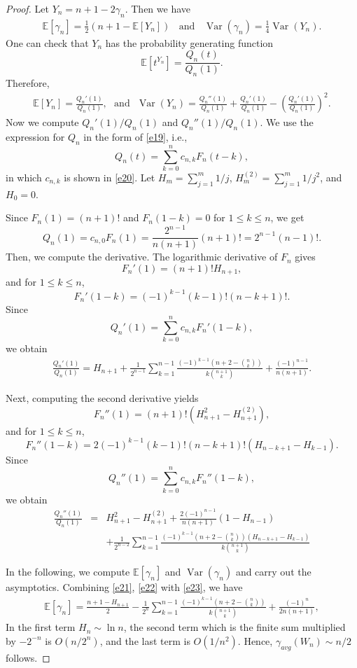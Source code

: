 \documentclass[10pt,a4paper]{amsart}
\newcommand{\E}{\mathbb{E}}
\newcommand{\Var}{\operatorname{Var}}
\begin{document}
\begin{proof} Let \(Y_n=n+1-2\gamma_n\). Then we have
\begin{eqnarray}\label{e21}
\E[\gamma_n]=\frac12\left(n+1-\E[Y_n]\right) ~~~~\mbox{and}~~~~\Var(\gamma_n)=\frac14\Var(Y_n).\end{eqnarray}
One can check that $Y_n$ has the probability generating function
\[
\E[t^{Y_n}]=\frac{Q_n(t)}{Q_n(1)}.
\]
Therefore,
\begin{eqnarray}\label{e22}\E[Y_n]=\frac{Q_n'(1)}{Q_n(1)},~~~\mbox{and}~~~
\Var(Y_n)=\frac{Q_n''(1)}{Q_n(1)}
+\frac{Q_n'(1)}{Q_n(1)}
-\left(\frac{Q_n'(1)}{Q_n(1)}\right)^2.\end{eqnarray}
Now we compute $Q_n'(1)/Q_n(1)$ and $Q_n''(1)/Q_n(1)$. We use the expression for $Q_n$ in the form of \eqref{e19}, i.e., \[
Q_n(t)=\sum_{k=0}^{n}c_{n,k}F_n(t-k),
\] in which $c_{n,k}$ is shown in \eqref{e20}.  Let \(H_m=\sum_{j=1}^m1/j\), \(H_m^{(2)}=\sum_{j=1}^m1/j^2\), and \(H_0=0\).

Since \(F_n(1)=(n+1)!\)  and \(F_n(1-k)=0\)  for \(1\le k\le n\), we get
\[
Q_n(1)=c_{n,0}F_n(1)=\frac{2^{n-1}}{n(n+1)}(n+1)!=2^{n-1}(n-1)!.
\]
Then, we compute the derivative. The logarithmic derivative of \(F_n\) gives
\[
F_n'(1)=(n+1)!H_{n+1},
\]
and for \(1\le k\le n\),
\[
F_n'(1-k)=(-1)^{k-1}(k-1)!(n-k+1)!.
\]
Since
\[
Q_n'(1)=\sum_{k=0}^n c_{n,k}F_n'(1-k),
\]
we obtain
\begin{eqnarray}\label{e23}
\frac{Q_n'(1)}{Q_n(1)}
=
H_{n+1}
+
\frac{1}{2^{n-1}}
\sum_{k=1}^{n-1}
\frac{(-1)^{k-1}\left(n+2-\binom{n}{k}\right)}
{k\binom{n+1}{k}}
+
\frac{(-1)^{n-1}}{n(n+1)}.
\end{eqnarray}

Next, computing the second derivative yields
\[
F_n''(1)=(n+1)!\left(H_{n+1}^2-H_{n+1}^{(2)}\right),
\]
and for \(1\le k\le n\),
\[
F_n''(1-k)=2(-1)^{k-1}(k-1)!(n-k+1)!\left(H_{n-k+1}-H_{k-1}\right).
\]
Since
\[
Q_n''(1)=\sum_{k=0}^n c_{n,k}F_n''(1-k),
\] we obtain
\begin{eqnarray}\label{e24}
\frac{Q_n''(1)}{Q_n(1)}
&=&H_{n+1}^2-H_{n+1}^{(2)}+\frac{2(-1)^{n-1}}{n(n+1)}(1-H_{n-1})\nonumber\\
&&+\frac{1}{2^{n-2}}
\sum_{k=1}^{n-1}
\frac{(-1)^{k-1}\left(n+2-\binom{n}{k}\right)
\left(H_{n-k+1}-H_{k-1}\right)}
{k\binom{n+1}{k}}
\end{eqnarray}

In the following, we compute $\E[\gamma_n]$ and $\Var(\gamma_n)$ and carry out the asymptotics.
Combining \eqref{e21}, \eqref{e22} with \eqref{e23}, we have
\begin{eqnarray}\label{e25}
\E[{\gamma_n}]=
\frac{n+1-H_{n+1}}{2}
-\frac{1}{2^n}
\sum_{k=1}^{n-1}
\frac{(-1)^{k-1}\left(n+2-\binom{n}{k}\right)}
{k\binom{n+1}{k}}
+\frac{(-1)^n}{2n(n+1)},
\end{eqnarray}
In the first term $H_n\sim \ln n$, the second term which is the finite sum multiplied by $-2^{-n}$ is
$O(n/2^{n})$, and the last term is $O(1/n^{2})$. Hence, $\gamma_{avg}(W_n)\sim n/2$ follows.


\end{proof}
\end{document}
